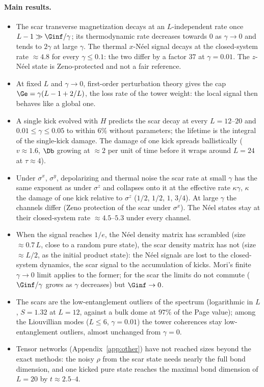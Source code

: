 \paragraph{Main results.}
\begin{itemize}
\item The scar transverse magnetization decays at an $L$-independent rate once $L - 1 \gg \Ginf/\gamma$; its thermodynamic rate decreases towards $0$ as $\gamma \to 0$ and tends to $2\gamma$ at large $\gamma$. The thermal $x$-N\'eel signal decays at the closed-system rate $\approx 4.8$ for every $\gamma \le 0.1$: the two differ by a factor $37$ at $\gamma = 0.01$. The $z$-N\'eel state is Zeno-protected and not a fair reference.
\item At fixed $L$ and $\gamma \to 0$, first-order perturbation theory gives the cap $\Ge = \gamma(L - 1 + 2/L)$, the loss rate of the tower weight: the local signal then behaves like a global one.
\item A single kick evolved with $H$ predicts the scar decay at every $L = 12$--$20$ and $0.01 \le \gamma \le 0.05$ to within $6\%$ without parameters; the lifetime is the integral of the single-kick damage. The damage of one kick spreads ballistically ($v \approx 1.6$, $\Db$ growing at $\approx 2$ per unit of time before it wraps around $L = 24$ at $\tau \approx 4$).
\item Under $\sigma^x$, $\sigma^y$, depolarizing and thermal noise the scar rate at small $\gamma$ has the same exponent as under $\sigma^z$ and collapses onto it at the effective rate $\kappa\gamma$, $\kappa$ the damage of one kick relative to $\sigma^z$ ($1/2$, $1/2$, $1$, $3/4$). At large $\gamma$ the channels differ (Zeno protection of the scar under $\sigma^x$). The N\'eel states stay at their closed-system rate $\approx 4.5$--$5.3$ under every channel.
\item When the signal reaches $1/e$, the N\'eel density matrix has scrambled (size $\approx 0.7\,L$, close to a random pure state), the scar density matrix has not (size $\approx L/2$, as the initial product state): the N\'eel signals are lost to the closed-system dynamics, the scar signal to the accumulation of kicks. Mori's finite $\gamma \to 0$ limit applies to the former; for the scar the limits do not commute ($\Ginf/\gamma$ grows as $\gamma$ decreases) but $\Ginf \to 0$.
\item The scars are the low-entanglement outliers of the spectrum (logarithmic in $L$, $S = 1.32$ at $L = 12$, against a bulk dome at $97\%$ of the Page value); among the Liouvillian modes ($L \le 6$, $\gamma = 0.01$) the tower coherences stay low-entanglement outliers, almost unchanged from $\gamma = 0$.
\item Tensor networks (Appendix~\ref{app:other}) have not reached sizes beyond the exact methods: the noisy $\rho$ from the scar state needs nearly the full bond dimension, and one kicked pure state reaches the maximal bond dimension of $L = 20$ by $t \approx 2.5$--$4$.
\end{itemize}

